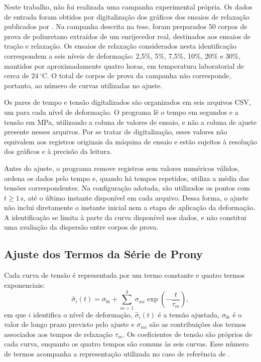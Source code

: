 \documentclass[arial,centeredequations,english,brazilian,oneside,section=TITLE]{ifes8}
\begin{document}
Neste trabalho, não foi realizada uma campanha experimental própria. Os dados de entrada foram
obtidos por digitalização dos gráficos dos ensaios de relaxação publicados por
. Na campanha descrita na tese, foram preparados 50 corpos de
prova de poliuretano extraídos de um enrijecedor real, destinados aos ensaios de tração e
relaxação. Os ensaios de relaxação considerados nesta identificação correspondem a seis níveis
de deformação: 2,5\%, 5\%, 7,5\%, 10\%, 20\% e 30\%, mantidos por aproximadamente quatro horas,
em temperatura laboratorial de cerca de $24\,^{\circ}\mathrm{C}$. O total de corpos de prova
da campanha não corresponde, portanto, ao número de curvas utilizadas no ajuste.

Os pares de tempo e tensão digitalizados são organizados em seis arquivos CSV, um para cada
nível de deformação. O programa lê o tempo em segundos e a tensão em MPa, utilizando a coluna
de valores de ensaio, e não a coluna de ajuste presente nesses arquivos. Por se tratar de
digitalização, esses valores não equivalem aos registros
originais da máquina de ensaio e estão sujeitos à resolução dos gráficos e à precisão da
leitura.

Antes do ajuste, o programa remove registros sem valores numéricos válidos, ordena os dados
pelo tempo e, quando há tempos repetidos, utiliza a média das tensões correspondentes.
Na configuração adotada, são utilizados os pontos com $t\geq1\,\mathrm{s}$, até o último
instante disponível em cada arquivo. Dessa forma, o ajuste não inclui diretamente o instante
inicial nem a etapa de aplicação da deformação. A identificação se limita à parte da curva
disponível nos dados, e não constitui uma avaliação da dispersão entre corpos de prova.

\subsection{Ajuste dos Termos da Série de Prony}
\label{sec:ajuste-prony}

Cada curva de tensão é representada por um termo constante e quatro termos exponenciais:
\begin{equation}
  \label{eq:ajuste-tensao-prony}
  \widehat{\sigma}_i(t)=\sigma_{0i}
  +\sum_{m=1}^{4}\sigma_{mi}\exp\left(-\frac{t}{\tau_m}\right),
\end{equation}
em que $i$ identifica o nível de deformação, $\widehat{\sigma}_i(t)$ é a tensão ajustada,
$\sigma_{0i}$ é o valor de longo prazo previsto pelo ajuste e $\sigma_{mi}$ são as
contribuições dos termos associados aos tempos de relaxação $\tau_m$. Os coeficientes de
tensão são próprios de cada curva, enquanto os quatro tempos são comuns às seis curvas.
Esse número de termos acompanha a representação utilizada no caso de referência de
.
\end{document}
